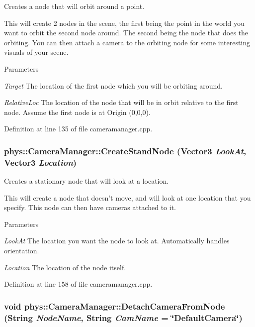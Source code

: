 Creates a node that will orbit around a point. 

This will create 2 nodes in the scene, the first being the point in the world you want to orbit the second node around. The second being the node that does the orbiting. You can then attach a camera to the orbiting node for some interesting visuals of your scene. 
\begin{DoxyParams}{Parameters}
\item[{\em Target}]The location of the first node which you will be orbiting around. \item[{\em RelativeLoc}]The location of the node that will be in orbit relative to the first node. Assume the first node is at Origin (0,0,0). \end{DoxyParams}


Definition at line 135 of file cameramanager.cpp.

\hypertarget{classphys_1_1CameraManager_ab5f9ca6b053670e69f5812cf573d5972}{
\subsubsection[{CreateStandNode}]{ phys::CameraManager::CreateStandNode ({\bf Vector3} {\em LookAt}, \/  {\bf Vector3} {\em Location})}}
\label{d9/d91/classphys_1_1CameraManager_ab5f9ca6b053670e69f5812cf573d5972}


Creates a stationary node that will look at a location. 

This will create a node that doesn't move, and will look at one location that you specify. This node can then have cameras attached to it. 
\begin{DoxyParams}{Parameters}
\item[{\em LookAt}]The location you want the node to look at. Automatically handles orientation. \item[{\em Location}]The location of the node itself. \end{DoxyParams}


Definition at line 158 of file cameramanager.cpp.

\hypertarget{classphys_1_1CameraManager_a5137bdb9dec706fa0fafec665d4f71c8}{
\subsubsection[{DetachCameraFromNode}]{\setlength{\rightskip}{0pt plus 5cm}void phys::CameraManager::DetachCameraFromNode ({\bf String} {\em NodeName}, \/  {\bf String} {\em CamName} = {\ttfamily \char`\"{}DefaultCamera\char`\"{}})}}
\label{d9/d91/classphys_1_1CameraManager_a5137bdb9dec706fa0fafec665d4f71c8}



